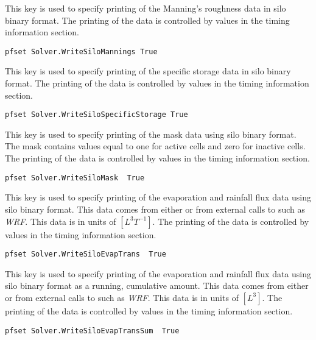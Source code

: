 {
This key is used to specify printing of the Manning's roughness data in silo binary format.
The printing of the data is controlled by values in the
timing information section.
}
\begin{display}\begin{verbatim}
pfset Solver.WriteSiloMannings True
\end{verbatim}\end{display}

{
This key is used to specify printing of the specific storage data in silo binary format.
The printing of the data is controlled by values in the
timing information section.
}
\begin{display}\begin{verbatim}
pfset Solver.WriteSiloSpecificStorage True
\end{verbatim}\end{display}

{
This key is used to specify printing of the mask data using silo binary format.  The mask contains values equal to one for active cells and zero for inactive cells.
The printing of the data is controlled by values in the
timing information section.
}
\begin{display}\begin{verbatim}
pfset Solver.WriteSiloMask  True
\end{verbatim}\end{display}

{
This key is used to specify printing of the evaporation and rainfall flux data using silo binary format.  This data comes from either  or from external calls to \parflow{} such as \emph{WRF}.  This data is in units of $[L^3 T^{-1}]$.
The printing of the data is controlled by values in the
timing information section.
}
\begin{display}\begin{verbatim}
pfset Solver.WriteSiloEvapTrans  True
\end{verbatim}\end{display}

{
This key is used to specify printing of the evaporation and rainfall flux data using silo binary format as a running, cumulative amount.  This data comes from either  or from external calls to \parflow{} such as \emph{WRF}.  This data is in units of $[L^3]$.
The printing of the data is controlled by values in the
timing information section.
}
\begin{display}\begin{verbatim}
pfset Solver.WriteSiloEvapTransSum  True
\end{verbatim}\end{display}

